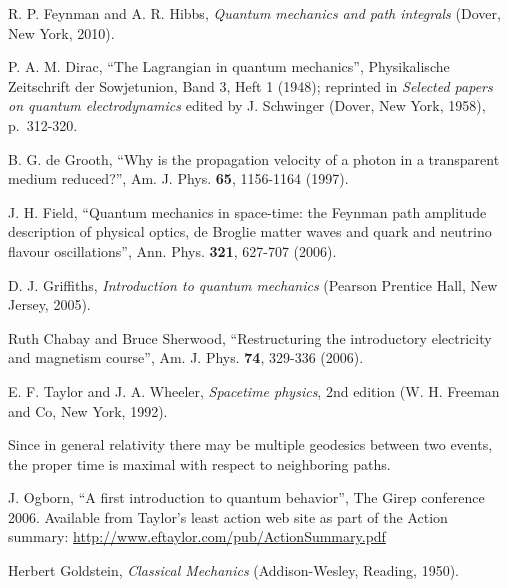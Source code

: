 \documentclass[prb,oncolumn]{revtex4-2}
\begin{document}
\begin{thebibliography}{99}
 R. P. Feynman and A. R. Hibbs, \textit{Quantum mechanics and path integrals} (Dover, New York, 2010).

 P. A. M. Dirac, ``The Lagrangian in quantum mechanics'', Physikalische Zeitschrift der Sowjetunion, Band 3, Heft 1 (1948); reprinted in  \textit{Selected papers on quantum electrodynamics} edited by J. Schwinger (Dover, New York, 1958), p.~312-320.

 B. G. de Grooth, ``Why is the propagation velocity of a photon in a transparent medium reduced?'', Am. J. Phys. \textbf{65}, 1156-1164 (1997).

 J. H. Field, ``Quantum mechanics in space-time: the Feynman path amplitude description of physical optics, de Broglie matter waves and quark and neutrino flavour oscillations'', Ann. Phys. \textbf{321}, 627-707 (2006).

  D. J. Griffiths, \textit{Introduction to quantum mechanics} (Pearson Prentice Hall, New Jersey, 2005).

 Ruth Chabay and Bruce Sherwood, ``Restructuring the introductory electricity and magnetism course'', Am. J. Phys. \textbf{74}, 329-336 (2006).

 E. F. Taylor and J. A. Wheeler, \textit{Spacetime physics}, 2nd edition (W. H. Freeman and Co, New York, 1992).

 Since in general relativity there may be multiple geodesics between two events, the proper time is maximal with respect to neighboring paths. 

 J. Ogborn, ``A first introduction to quantum behavior'', The Girep conference 2006. Available from Taylor's least action web site \cite{Resources} as part of the Action summary: \url{http://www.eftaylor.com/pub/ActionSummary.pdf}

 Herbert Goldstein, \textit{Classical Mechanics} (Addison-Wesley, Reading, 1950).

\end{thebibliography}
\end{document}

